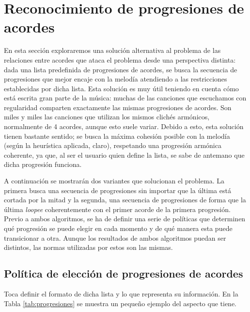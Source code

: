 \section{Reconocimiento de progresiones de acordes}

En esta sección exploraremos una solución alternativa al problema de las relaciones entre acordes que ataca el problema desde una perspectiva distinta: dada una lista predefinida de progresiones de acordes, se busca la secuencia de progresiones que mejor encaje con la melodía atendiendo a las restricciones establecidas por dicha lista. Esta solución es muy útil teniendo en cuenta cómo está escrita gran parte de la música: muchas de las canciones que escuchamos con regularidad comparten exactamente las mismas progresiones de acordes. Son miles y miles las canciones que utilizan los mismos clichés armónicos, normalmente de 4 acordes, aunque esto suele variar. Debido a esto, esta solución tienen bastante sentido; se busca la máxima cohesión posible con la melodía (según la heurística aplicada, claro), respetando una progresión armónica coherente, ya que, al ser el usuario quien define la lista, se sabe de antemano que dicha progresión funciona.

A continuación se mostrarán dos variantes que solucionan el problema. La primera busca una secuencia de progresiones sin importar que la última está cortada por la mitad y la segunda, una secuencia de progresiones de forma que la última \textit{loopee} coherentemente con el primer acorde de la primera progresión. Previo a ambos algoritmos, se ha de definir una serie de políticas que determinen qué progresión se puede elegir en cada momento y de qué manera esta puede transicionar a otra. Aunque los resultados de ambos algoritmos puedan ser distintos, las normas utilizadas por estos son las mismas.

\subsection{Política de elección de progresiones de acordes}\label{arm:sebsebsec:politica}

Toca definir el formato de dicha lista y lo que representa su información. En la Tabla \ref{tab:progresiones} se muestra un pequeño ejemplo del aspecto que tiene.

